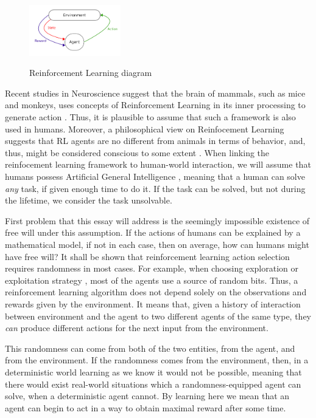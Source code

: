 \documentclass[a4paper]{article}
\begin{document}
\begin{figure}[h]
	\caption{Reinforcement Learning diagram}
	\centering \includegraphics[width=150px]{RL.png}
	\label{RL}
\end{figure}

Recent studies in Neuroscience suggest that the brain of mammals, such as mice and monkeys, uses concepts of Reinforcement Learning in its inner processing to generate action \cite{doyareward, doya2}. Thus, it is plausible to assume that such a framework is also used in humans. Moreover, a philosophical view on Reinfocement Learning suggests that RL agents are no different from animals in terms of behavior, and, thus, might be considered conscious to some extent \cite{rlmorality1, rlmorality2}. When linking the reinfocement learning framework to human-world interaction, we will assume that humans possess Artificial General Intelligence \cite{shane}, meaning that a human can solve {\em any} task, if given enough time to do it. If the task can be solved, but not during the lifetime, we consider the task unsolvable.

First problem that this essay will address is the seemingly impossible existence of free will under this assumption. If the actions of humans can be explained by a mathematical model, if not in each case, then on average, how can humans might have free will? It shall be shown that reinforcement learning action selection requires randomness in most cases. For example, when choosing exploration or exploitation strategy \cite{sutton}, most of the agents use a source of random bits. Thus, a reinforcement learning algorithm does not depend solely on the observations and rewards given by the environment. It means that, given a history of interaction between environment and the agent to two different agents of the same type, they {\em can} produce different actions for the next input from the environment.

This randomness can come from both of the two entities, from the agent, and from the environment. If the randomness comes from the environment, then, in a deterministic world learning as we know it would not be possible, meaning that there would exist real-world situations which a randomness-equipped agent can solve, when a deterministic agent cannot. By learning here we mean that an agent can begin to act in a way to obtain maximal reward after some time.
\end{document}
